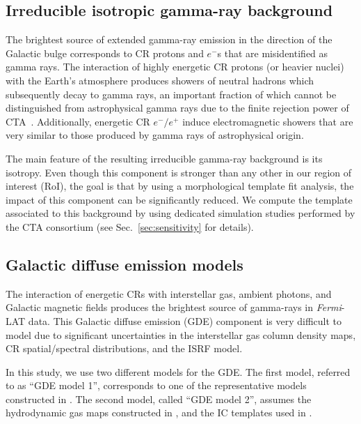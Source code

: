 \documentclass[doublespace,nopageskip]{VTthesis} %
\begin{document}
\subsection{Irreducible isotropic gamma-ray background}
The brightest source of extended gamma-ray emission in the direction of the Galactic bulge corresponds to CR protons and $e^{-}$s that are misidentified as gamma rays. The interaction of highly energetic CR protons (or heavier nuclei) with the Earth's atmosphere produces showers of neutral hadrons which subsequently decay to gamma rays, an important fraction of which cannot be distinguished from astrophysical gamma rays due to the finite rejection power of CTA~\citep{Acharyya:2020sbj,Rinchiuso:2020skh}. Additionally, energetic CR $e^{-}/e^{+}$ induce electromagnetic showers that are very similar to those produced by gamma rays of astrophysical origin. 

The main feature of the resulting irreducible gamma-ray background is its isotropy. Even though this component is stronger than any other in our region of interest (RoI), the goal is that by using a morphological template fit analysis, the impact of this component can be significantly reduced. We compute the template associated to this background by using dedicated simulation studies performed by the CTA consortium (see Sec.~\ref{sec:sensitivity} for details). 


\subsection{Galactic diffuse emission models}
\label{subsec:GDEmodels}

The interaction of energetic CRs with interstellar gas, ambient photons, and Galactic magnetic fields produces the brightest source of gamma-rays in \textit{Fermi}-LAT data. This Galactic diffuse emission (GDE) component is very difficult to model due to significant uncertainties in the interstellar gas column density maps, CR spatial/spectral distributions, and the ISRF model.   

In this study, we use two different models for the GDE. The first model, referred to as ``GDE model 1'', corresponds to one of the representative models constructed in \cite{Johannesson:2018bit}. The second model, called ``GDE model 2'', assumes the hydrodynamic gas maps constructed in \cite{Macias:2016nev}, and the IC templates used in \cite{Abazajian:2020tww}.     
\end{document}
